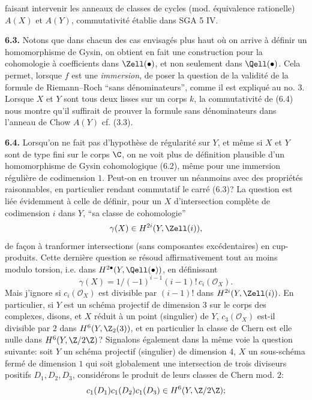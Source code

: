 faisant intervenir les anneaux de classes de cycles (mod. équivalence rationelle) $A(X)$ et $A(Y)$, commutativité établie dans SGA 5 IV.

\textbf{6.3.} Notons que dans chacun des cas envisagés plus haut où on arrive à définir un homomorphisme de Gysin, on obtient en fait une construction pour la cohomologie à coefficients dans $\Zell(\bullet)$, et non seulement dans $\Qell(\bullet)$. Cela permet, lorsque $f$ est une \emph{immersion}, de poser la question de la validité de la formule de Riemann--Roch ``sans dénominateurs'', comme il est expliqué au no. 3. Lorsque $X$ et $Y$ sont tous deux lisses sur un corps $k$, la commutativité de (6.4) nous montre qu'il suffirait de prouver la formule sans dénominateurs dans l'anneau de Chow $A(Y)$ cf. (3.3).

\textbf{6.4.} Lorsqu'on ne fait pas d'hypothèse de régularité sur $Y$, et même si $X$ et $Y$ sont de type fini sur le corps $\C$, on ne voit plus de définition plausible d'un homomorphisme de Gysin cohomologique (6.2), même pour une immersion régulière de codimension $1$. Peut-on en trouver un néanmoins avec des propriétés raisonnables, en particulier rendant commutatif le carré (6.3)? La question est liée évidemment à celle de définir, pour un $X$ d'intersection complète de codimension $i$ dans $Y$, ``sa classe de cohomologie''
\[
 \gamma(X)\in H^{2i}(Y,\Zell(i)),
\]
de façon à tranformer intersections (sans composantes excédentaires) en cup-produits. Cette dernière question se résoud affirmativement tout au moins modulo torsion, i.e. dans $H^{2\bullet}(Y,\Qell(\bullet))$, en définissant
\[
 \gamma(X)=1/(-1)^{i-1}(i-1)!\,c_i(\mathcal O_X).
\]
Mais j'ignore si $c_i(\mathcal O_X)$ est divisible par $(i-1)!$ dans $H^{2i}(Y,\Zell(i))$. En particulier, si $Y$ est un schéma projectif de dimension $3$ sur le corps des complexes, disons, et $X$ réduit à un point (singulier) de $Y$, $c_3(\mathcal O_X)$ est-il divisible par $2$ dans $H^6(Y,\Z_2(3))$, et en particulier la classe de Chern est elle nulle dans $H^6(Y,\Z/2\Z)$? Signalons également dans la même voie la question suivante: soit $Y$ un schéma projectif (singulier) de dimension $4$, $X$ un sous-schéma fermé de dimension $1$ qui soit globalement une intersection de trois diviseurs positifs $D_1,D_2,D_3$, considérons le produit de leurs classes de Chern mod. $2$:
\[
 c_1(D_1)c_1(D_2)c_1(D_3)\in H^6(Y,\Z/2\Z);
\]
